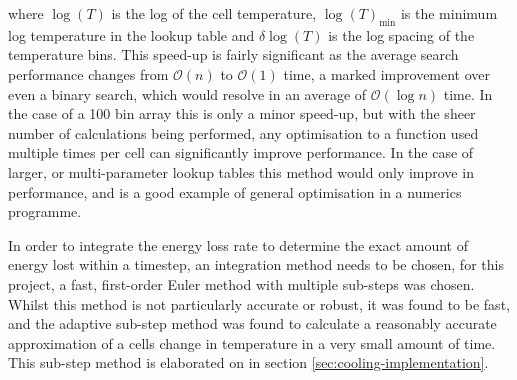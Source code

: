 \noindent
where $\log(T)$ is the log of the cell temperature, $\log (T)_\text{min}$ is the minimum log temperature in the lookup table and $\delta \log (T)$ is the log spacing of the temperature bins. 
This speed-up is fairly significant as the average search performance changes from $\mathcal{O}(n)$ to $\mathcal{O}(1)$ time, a marked improvement over even a binary search, which would resolve in an average of $\mathcal{O}(\log n)$ time.
In the case of a 100 bin array this is only a minor speed-up, but with the sheer number of calculations being performed, any optimisation to a function used multiple times per cell can significantly improve performance.
In the case of larger, or multi-parameter lookup tables this method would only improve in performance, and is a good example of general optimisation in a numerics programme.

In order to integrate the energy loss rate to determine the exact amount of energy lost within a timestep, an integration method needs to be chosen, for this project, a fast, first-order Euler method with multiple sub-steps was chosen. Whilst this method is not particularly accurate or robust, it was found to be fast, and the adaptive sub-step method was found to calculate a reasonably accurate approximation of a cells change in temperature in a very small amount of time. This sub-step method is elaborated on in section \ref{sec:cooling-implementation}.

